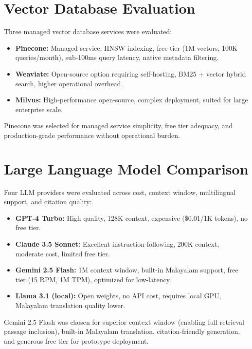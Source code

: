 \documentclass[12pt,a4paper]{report}
\begin{document}
\section{Vector Database Evaluation}
Three managed vector database services were evaluated:
\begin{itemize}
    \item \textbf{Pinecone:} Managed service, HNSW indexing, free tier (1M vectors, 100K queries/month), sub-100ms query latency, native metadata filtering.
    \item \textbf{Weaviate:} Open-source option requiring self-hosting, BM25 + vector hybrid search, higher operational overhead.
    \item \textbf{Milvus:} High-performance open-source, complex deployment, suited for large enterprise scale.
\end{itemize}
Pinecone was selected for managed service simplicity, free tier adequacy, and production-grade performance without operational burden.

\section{Large Language Model Comparison}
Four LLM providers were evaluated across cost, context window, multilingual support, and citation quality:
\begin{itemize}
    \item \textbf{GPT-4 Turbo:} High quality, 128K context, expensive (\$0.01/1K tokens), no free tier.
    \item \textbf{Claude 3.5 Sonnet:} Excellent instruction-following, 200K context, moderate cost, limited free tier.
    \item \textbf{Gemini 2.5 Flash:} 1M context window, built-in Malayalam support, free tier (15 RPM, 1M TPM), optimized for low-latency.
    \item \textbf{Llama 3.1 (local):} Open weights, no API cost, requires local GPU, Malayalam translation quality lower.
\end{itemize}
Gemini 2.5 Flash was chosen for superior context window (enabling full retrieval passage inclusion), built-in Malayalam translation, citation-friendly generation, and generous free tier for prototype deployment.
\end{document}

